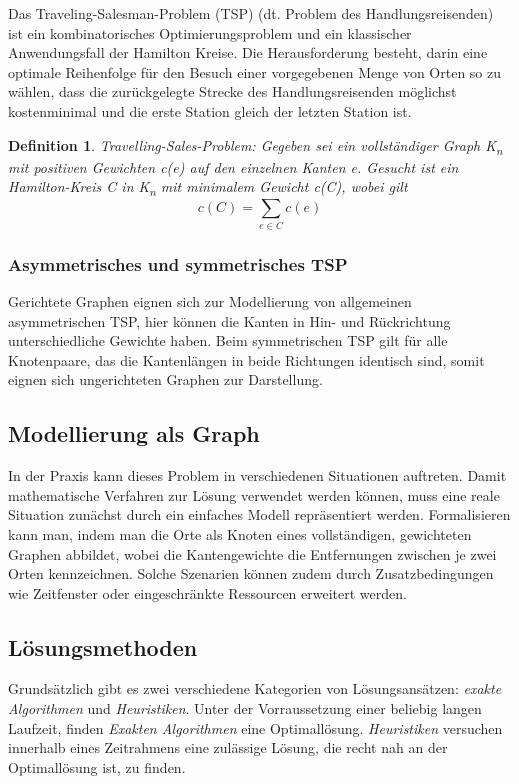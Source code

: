 \documentclass{article}
\newtheorem{mydef}{Definition}
\begin{document}
Das Traveling-Salesman-Problem (TSP) (dt. Problem des Handlungsreisenden) ist ein kombinatorisches Optimierungsproblem und ein klassischer Anwendungsfall der Hamilton Kreise. Die Herausforderung besteht, darin eine optimale Reihenfolge für den Besuch einer vorgegebenen Menge von Orten so zu wählen, dass die zurückgelegte Strecke des Handlungsreisenden möglichst kostenminimal und die erste Station gleich der letzten Station ist.

\begin{mydef}
	Travelling-Sales-Problem: Gegeben sei ein vollständiger Graph K\textsubscript{n} mit positiven Gewichten \textit{c(e)} auf den einzelnen Kanten  \textit{e}. Gesucht ist ein Hamilton-Kreis \textit{C} in K\textsubscript{n} mit minimalem Gewicht c(C), wobei gilt
	\[c(C) =  \sum_{e \in C}  c(e) \]
\end{mydef}

\subsubsection*{Asymmetrisches und symmetrisches TSP}

Gerichtete Graphen eignen sich zur Modellierung von allgemeinen asymmetrischen TSP, hier können die Kanten in Hin- und Rückrichtung unterschiedliche Gewichte haben. Beim symmetrischen TSP gilt für alle Knotenpaare, das die Kantenlängen in beide Richtungen identisch sind, somit eignen sich ungerichteten Graphen zur Darstellung.

\subsection{Modellierung als Graph}

In der Praxis kann dieses Problem in verschiedenen Situationen auftreten. Damit mathematische Verfahren zur Lösung verwendet werden können, muss eine reale Situation zunächst durch ein einfaches Modell repräsentiert werden. Formalisieren kann man, indem man die Orte als Knoten eines vollständigen, gewichteten Graphen abbildet, wobei die Kantengewichte die
Entfernungen zwischen je zwei Orten kennzeichnen. Solche Szenarien können zudem durch Zusatzbedingungen wie Zeitfenster oder eingeschränkte Ressourcen erweitert werden.

\subsection{Lösungsmethoden}

Grundsätzlich gibt es zwei verschiedene Kategorien von Lösungsansätzen: \textit{exakte Algorithmen} und \textit{Heuristiken}. Unter der Vorraussetzung einer beliebig langen Laufzeit, finden \textit{Exakten Algorithmen} eine Optimallösung. \textit{Heuristiken} versuchen innerhalb eines Zeitrahmens eine zulässige Lösung, die recht nah an der Optimallösung ist, zu finden.
\end{document}
